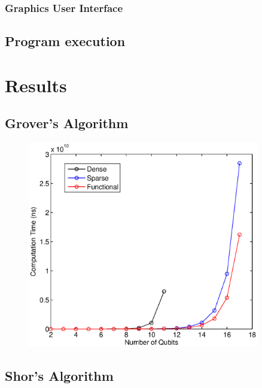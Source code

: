 \documentclass[bibliography=totocnumbered]{article}
\theoremstyle{NoticeStyle}
\begin{document}
\subsubsection{Graphics User Interface}

\subsection{Program execution}


%
\section{Results}\label{sec:Results}

\subsection{Grover's Algorithm}\label{sec:Grover}
\begin{figure}[h]
\centering
\includegraphics[width=0.9\textwidth]{Grover_Time_Performance.eps}
\caption{}
\label{grover_time_performance}
\end{figure}
\subsection{Shor's Algorithm}\label{sec:Shor}
\end{document}
